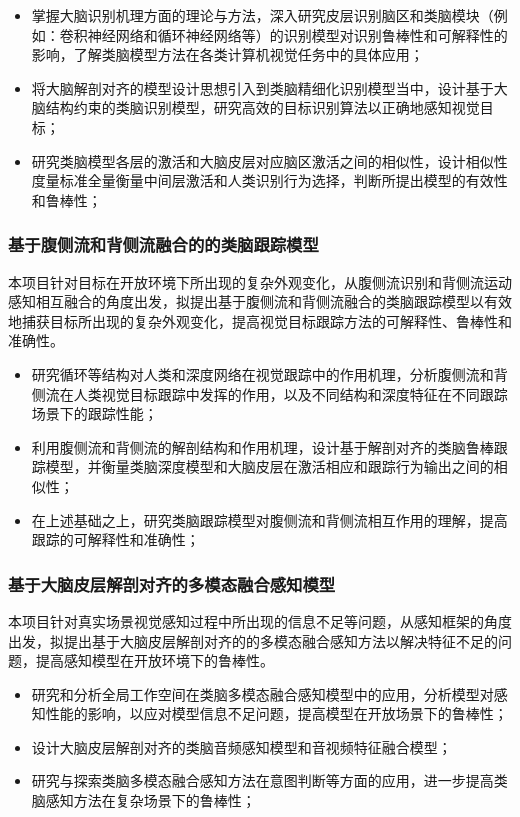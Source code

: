 \documentclass[a4paper,zihao=-4]{article}
\begin{document}
\begin{itemize}
	\item 掌握大脑识别机理方面的理论与方法，深入研究皮层识别脑区和类脑模块（例如：卷积神经网络和循环神经网络等）的识别模型对识别鲁棒性和可解释性的影响，了解类脑模型方法在各类计算机视觉任务中的具体应用；
	\item 将大脑解剖对齐的模型设计思想引入到类脑精细化识别模型当中，设计基于大脑结构约束的类脑识别模型，研究高效的目标识别算法以正确地感知视觉目标；
	\item 研究类脑模型各层的激活和大脑皮层对应脑区激活之间的相似性，设计相似性度量标准全量衡量中间层激活和人类识别行为选择，判断所提出模型的有效性和鲁棒性；
\end{itemize}

\subsubsection{基于腹侧流和背侧流融合的的类脑跟踪模型}
本项目针对目标在开放环境下所出现的复杂外观变化，从腹侧流识别和背侧流运动感知相互融合的角度出发，拟提出基于腹侧流和背侧流融合的类脑跟踪模型以有效地捕获目标所出现的复杂外观变化，提高视觉目标跟踪方法的可解释性、鲁棒性和准确性。

\begin{itemize}
	\item 研究循环等结构对人类和深度网络在视觉跟踪中的作用机理，分析腹侧流和背侧流在人类视觉目标跟踪中发挥的作用，以及不同结构和深度特征在不同跟踪场景下的跟踪性能；
	\item 利用腹侧流和背侧流的解剖结构和作用机理，设计基于解剖对齐的类脑鲁棒跟踪模型，并衡量类脑深度模型和大脑皮层在激活相应和跟踪行为输出之间的相似性；
	\item 在上述基础之上，研究类脑跟踪模型对腹侧流和背侧流相互作用的理解，提高跟踪的可解释性和准确性；
\end{itemize}


\subsubsection{基于大脑皮层解剖对齐的多模态融合感知模型}
本项目针对真实场景视觉感知过程中所出现的信息不足等问题，从感知框架的角度出发，拟提出基于大脑皮层解剖对齐的的多模态融合感知方法以解决特征不足的问题，提高感知模型在开放环境下的鲁棒性。

\begin{itemize}
	\item 研究和分析全局工作空间在类脑多模态融合感知模型中的应用，分析模型对感知性能的影响，以应对模型信息不足问题，提高模型在开放场景下的鲁棒性；
	\item 设计大脑皮层解剖对齐的类脑音频感知模型和音视频特征融合模型；
	\item 研究与探索类脑多模态融合感知方法在意图判断等方面的应用，进一步提高类脑感知方法在复杂场景下的鲁棒性；
\end{itemize} 
\end{document}
